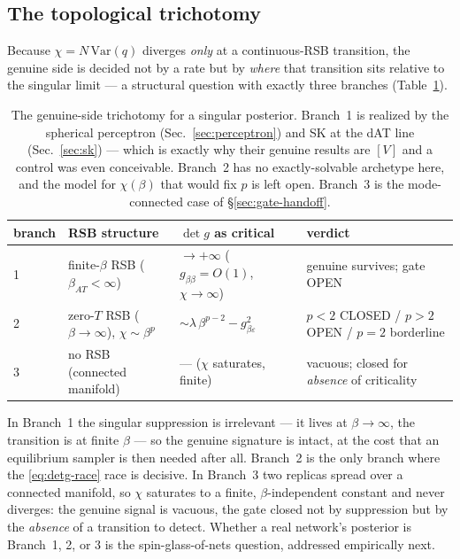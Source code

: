 \documentclass[a4paper,11pt]{article}
\theoremstyle{plain}
\theoremstyle{definition}
\theoremstyle{remark}
\newcommand{\eps}{\varepsilon}
\newcommand{\detg}{\det g}
\begin{document}
\subsection{The topological trichotomy}\label{sec:gate-trichotomy}
Because $\chi=N\,\mathrm{Var}(q)$ diverges \emph{only} at a continuous-RSB transition, the genuine side is
decided not by a rate but by \emph{where} that transition sits relative to the singular limit --- a
structural question with exactly three branches (Table~\ref{tab:trichotomy}).

\begin{table}[h]\centering
\begin{tabular}{@{}llll@{}}
\toprule
branch & RSB structure & $\detg$ as critical & verdict\\
\midrule
1 & finite-$\beta$ RSB ($\beta_{AT}<\infty$) & $\to+\infty$ ($g_{\beta\beta}=O(1)$, $\chi\to\infty$) & genuine survives; gate OPEN\\
2 & zero-$T$ RSB ($\beta\to\infty$), $\chi\sim\beta^{p}$ & $\sim\lambda\,\beta^{p-2}-g_{\beta\eps}^2$ & $p<2$ CLOSED / $p>2$ OPEN / $p=2$ borderline\\
3 & no RSB (connected manifold) & --- ($\chi$ saturates, finite) & vacuous; closed for \emph{absence} of criticality\\
\bottomrule
\end{tabular}
\caption{The genuine-side trichotomy for a singular posterior. Branch~1 is realized by the spherical
perceptron (Sec.~\ref{sec:perceptron}) and SK at the dAT line (Sec.~\ref{sec:sk}) --- which is exactly why
their genuine results are $[V]$ and a control was even conceivable. Branch~2 has no exactly-solvable
archetype here, and the model for $\chi(\beta)$ that would fix $p$ is left open. Branch~3 is the
mode-connected case of \S\ref{sec:gate-handoff}.}\label{tab:trichotomy}
\end{table}

In Branch~1 the singular suppression is irrelevant --- it lives at $\beta\to\infty$, the transition is at
finite $\beta$ --- so the genuine signature is intact, at the cost that an equilibrium sampler is then needed
after all. Branch~2 is the only branch where the \eqref{eq:detg-race} race is decisive. In Branch~3 two
replicas spread over a connected manifold, so $\chi$ saturates to a finite, $\beta$-independent constant and
never diverges: the genuine signal is vacuous, the gate closed not by suppression but by the \emph{absence}
of a transition to detect. Whether a real network's posterior is Branch~1, 2, or 3 is the spin-glass-of-nets
question, addressed empirically next.
\end{document}
